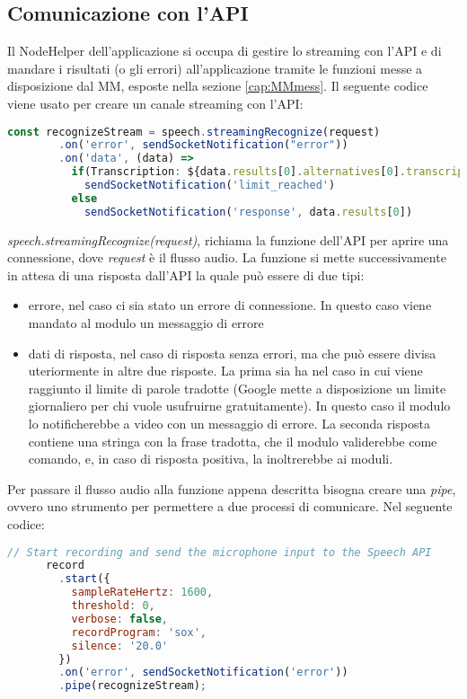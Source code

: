 \subsection{Comunicazione con l'API}\label{cap:api}
Il NodeHelper dell'applicazione si occupa di gestire lo streaming con l'API e
di mandare i risultati (o gli errori) all'applicazione tramite le funzioni messe
a disposizione dal MM, esposte nella sezione \ref{cap:MMmess}.
Il seguente codice viene usato per creare un canale streaming con l'API:
\begin{lstlisting}[language=Javascript, caption={Codice per l'inoltro dell'audio al Servizio Google}, captionpos=b]
      const recognizeStream = speech.streamingRecognize(request)
        .on('error', sendSocketNotification("error"))
        .on('data', (data) =>
          if(Transcription: ${data.results[0].alternatives[0].transcript})
            sendSocketNotification('limit_reached')
          else
            sendSocketNotification('response', data.results[0])
\end{lstlisting}
\emph{speech.streamingRecognize(request)}, richiama la funzione dell'API per aprire una connessione, dove \emph{request} \`e
il flusso audio.
La funzione si mette successivamente in attesa di una risposta dall'API la quale pu\`o essere di due tipi:
\begin{itemize}
\item errore, nel caso ci sia stato un errore di connessione. In questo caso viene mandato al modulo un messaggio di errore
\item dati di risposta, nel caso di risposta senza errori, ma che pu\`o essere divisa uteriormente in altre due risposte. La prima sia ha nel caso in cui
viene raggiunto il limite di parole tradotte (Google mette a disposizione un limite giornaliero per chi vuole usufruirne gratuitamente). In questo caso
il modulo lo notificherebbe a video con un messaggio di errore. La seconda risposta contiene una stringa con la frase tradotta,
che il modulo validerebbe come comando,
e, in caso di risposta positiva, la inoltrerebbe ai moduli.\\[1\baselineskip]
\end{itemize}
Per passare il flusso audio alla funzione appena descritta bisogna creare una \emph{pipe}, ovvero uno strumento
per permettere a due processi di comunicare.
Nel seguente codice:
\begin{lstlisting}[language=Javascript]
      // Start recording and send the microphone input to the Speech API
      record
        .start({
          sampleRateHertz: 1600,
          threshold: 0,
          verbose: false,
          recordProgram: 'sox',
          silence: '20.0'
        })
        .on('error', sendSocketNotification('error'))
        .pipe(recognizeStream);
\end{lstlisting}

